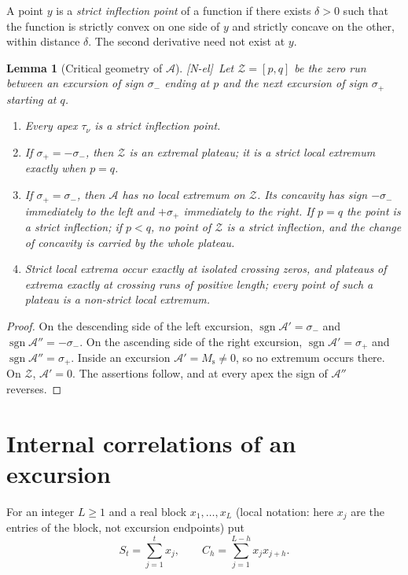 \documentclass[11pt,reqno]{amsart}
\numberwithin{equation}{section}
\theoremstyle{plain}
\newtheorem{lemma}[theorem]{Lemma}
\theoremstyle{definition}
\theoremstyle{remark}
\DeclareMathOperator{\sgn}{sgn}
\newcommand{\Ms}{M_{\mathrm{s}}}
\newcommand{\Anet}{\mathcal{A}}
\newcommand{\tagNE}{\textup{[N-el]}}
\begin{document}
A point $y$ is a \emph{strict inflection point} of a function if there
exists $\delta>0$ such that the function is strictly convex on one side of
$y$ and strictly concave on the other, within distance $\delta$. The second
derivative need not exist at $y$.

\begin{lemma}[Critical geometry of $\Anet$]
\label{lem:critical}
\tagNE\ Let $\mathcal Z=[p,q]$ be the zero run between an excursion of sign $\sigma_-$ ending
at $p$ and the next excursion of sign $\sigma_+$ starting at $q$.
\begin{enumerate}[label=\textup{(\roman*)}]
\item Every apex $\tau_\nu$ is a strict inflection point.
\item If $\sigma_+=-\sigma_-$, then $\mathcal Z$ is an extremal plateau; it is a
strict local extremum exactly when $p=q$.
\item If $\sigma_+=\sigma_-$, then $\Anet$ has no local extremum on
$\mathcal Z$. Its concavity has sign $-\sigma_-$ immediately to the left
and $+\sigma_+$ immediately to the right. If $p=q$ the point is a strict inflection; if
$p<q$, no point of $\mathcal Z$ is a strict inflection, and the change of concavity
is carried by the whole plateau.
\item Strict local extrema occur exactly at isolated crossing zeros, and
plateaus of extrema exactly at crossing runs of positive length; every point
of such a plateau is a non-strict local extremum.
\end{enumerate}
\end{lemma}

\begin{proof}
On the descending side of the left excursion,
$\sgn\Anet'=\sigma_-$ and $\sgn\Anet''=-\sigma_-$. On the ascending side of
the right excursion, $\sgn\Anet'=\sigma_+$ and $\sgn\Anet''=\sigma_+$. Inside an excursion
$\Anet'=\Ms\ne0$, so no extremum occurs there. On
$\mathcal Z$, $\Anet'=0$. The assertions follow, and at every apex the sign of
$\Anet''$ reverses.
\end{proof}


\section{Internal correlations of an excursion}
\label{sec:internal_corr}

For an integer $L\ge1$ and a real block $x_1,\dots,x_L$ (local notation:
here $x_j$ are the entries of the block, not excursion endpoints) put
\begin{equation}
\label{eq:block_def}
S_t=\sum_{j=1}^t x_j,\qquad
C_h=\sum_{j=1}^{L-h}x_jx_{j+h}.
\end{equation}
\end{document}
